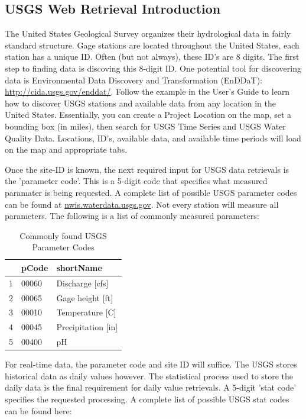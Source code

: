 \documentclass[a4paper,11pt]{article}
\begin{document}
\subsection{USGS Web Retrieval Introduction}
The United States Geological Survey organizes their hydrological data in fairly standard structure.  Gage stations are located throughout the United States, each station has a unique ID.  Often (but not always), these ID's are 8 digits.  The first step to finding data is discoving this 8-digit ID. One potential tool for discovering data is Environmental Data Discovery and Transformation (EnDDaT): \url{http://cida.usgs.gov/enddat/}.  Follow the example in the User's Guide to learn how to discover USGS stations and available data from any location in the United States. Essentially, you can create a Project Location on the map, set a bounding box (in miles), then search for USGS Time Series and USGS Water Quality Data. Locations, ID's, available data, and available time periods will load on the map and appropriate tabs.

Once the site-ID is known, the next required input for USGS data retrievals is the 'parameter code'.  This is a 5-digit code that specifies what measured paramater is being requested.  A complete list of possible USGS parameter codes can be found at \href{http://nwis.waterdata.usgs.gov/usa/nwis/pmcodes?radio_pm_search=param_group&pm_group=All+--+include+all+parameter+groups&pm_search=&casrn_search=&srsname_search=&format=html_table&show=parameter_group_nm&show=parameter_nm&show=casrn&show=srsname&show=parameter_units}{nwis.waterdata.usgs.gov}. Not every station will measure all parameters. The following is a list of commonly measured parameters:



\begin{table}[ht]
\begin{center}
\caption{Commonly found USGS Parameter Codes}
\begin{tabular}{rll}
  \hline
 & pCode & shortName \\ 
  \hline
1 & 00060 & Discharge [cfs] \\ 
  2 & 00065 & Gage height [ft] \\ 
  3 & 00010 & Temperature [C] \\ 
  4 & 00045 & Precipitation [in] \\ 
  5 & 00400 & pH \\ 
   \hline
\end{tabular}
\end{center}
\end{table}
For real-time data, the parameter code and site ID will suffice.  The USGS stores historical data as daily values however.  The statistical process used to store the daily data is the final requirement for daily value retrievals.  A 5-digit 'stat code' specifies the requested processing.  A complete list of possible USGS stat codes can be found here:
\end{document}
